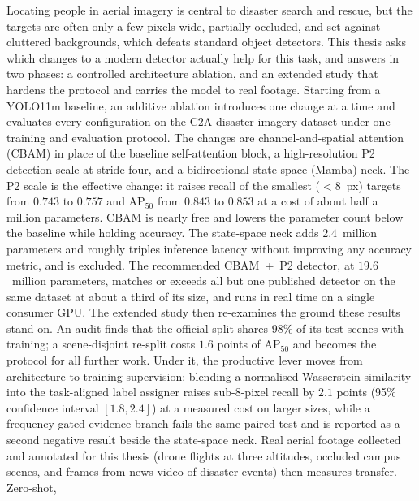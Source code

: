 
Locating people in aerial imagery is central to disaster search and rescue, but
the targets are often only a few pixels wide, partially occluded, and set against
cluttered backgrounds, which defeats standard object detectors. This thesis asks
which changes to a modern detector actually help for this task, and answers in
two phases: a controlled architecture ablation, and an extended study that
hardens the protocol and carries the model to real footage. Starting from a
YOLO11m baseline, an additive ablation introduces one change at a time and
evaluates every configuration on the C2A disaster-imagery dataset under one
training and evaluation protocol. The changes are channel-and-spatial attention
(CBAM) in place of the baseline self-attention block, a high-resolution P2
detection scale at stride four, and a bidirectional state-space (Mamba) neck.
The P2 scale is the effective change: it raises recall of the smallest
($<8$~px) targets from $0.743$ to $0.757$ and $\mathrm{AP}_{50}$ from $0.843$
to $0.853$ at a cost of about half a million parameters. CBAM is nearly free
and lowers the parameter count below the baseline while holding accuracy. The
state-space neck adds $2.4$~million parameters and roughly triples inference
latency without improving any accuracy metric, and is excluded. The recommended
CBAM~+~P2 detector, at $19.6$~million parameters, matches or exceeds all but one
published detector on the same dataset at about a third of its size, and runs in
real time on a single consumer GPU. The extended study then re-examines the
ground these results stand on. An audit finds that the official split shares
98\% of its test scenes with training; a scene-disjoint re-split costs $1.6$
points of $\mathrm{AP}_{50}$ and becomes the protocol for all further work.
Under it, the productive lever moves from architecture to training supervision:
blending a normalised Wasserstein similarity into the task-aligned label
assigner raises sub-8-pixel recall by $2.1$ points (95\% confidence interval
$[1.8, 2.4]$) at a measured cost on larger sizes, while a frequency-gated
evidence branch fails the same paired test and is reported as a second negative
result beside the state-space neck. Real aerial footage collected and annotated
for this thesis (drone flights at three altitudes, occluded campus scenes, and
frames from news video of disaster events) then measures transfer. Zero-shot,

